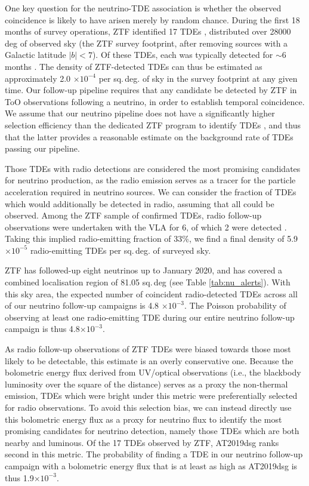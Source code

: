 One key question for the neutrino-TDE association is whether the observed coincidence is likely to have arisen merely by random chance. During the first 18 months of survey operations, ZTF identified 17 TDEs \cite{van_velzen_20}, distributed over 28000 deg of observed sky (the ZTF survey footprint, after removing sources with a Galactic latitude $|b|<7$). Of these TDEs, each was typically detected for $\sim$6 months \cite{van_velzen_20}. The density of ZTF-detected TDEs can thus be estimated as approximately 2.0 $\times 10^{-4}$ per sq.\,deg. of sky in the survey footprint at any given time. Our follow-up pipeline requires that any candidate be detected by ZTF in ToO observations following a neutrino, in order to establish temporal coincidence. We assume that our neutrino pipeline does not have a significantly higher selection efficiency than the dedicated ZTF program to identify TDEs \cite{van_velzen_20}, and thus that the latter provides a reasonable estimate on the background rate of TDEs passing our pipeline.

Those TDEs with radio detections are considered the most promising candidates for neutrino production, as the radio emission serves as a tracer for the particle acceleration required in neutrino sources. We can consider the fraction of TDEs which would additionally be detected in radio, assuming that all could be observed. Among the ZTF sample of confirmed TDEs, radio follow-up observations were undertaken with the VLA for 6, of which 2 were detected \cite{bran}. Taking this implied radio-emitting fraction of 33\%, we find a final density of 5.9 $\times 10^{-5}$ radio-emitting TDEs per sq.\,deg. of surveyed sky. 

ZTF has followed-up eight neutrinos up to January 2020, and has covered a combined localisation region of 81.05 sq.\,deg (see Table \ref{tab:nu_alerts}). With this sky area, the expected number of coincident radio-detected TDEs across all of our neutrino follow-up campaigns is 4.8 $\times 10^{-3}$. The Poisson probability of observing at least one radio-emitting TDE during our entire neutrino follow-up campaign is thus 4.8$ \times 10^{-3}$. 

As radio follow-up observations of ZTF TDEs were biased towards those most likely to be detectable, this estimate is an overly conservative one. Because the bolometric energy flux derived from UV/optical observations (i.e., the blackbody luminosity over the square of the distance) serves as a proxy the non-thermal emission, TDEs which were bright under this metric were preferentially selected for radio observations. To avoid this selection bias, we can instead directly use this bolometric energy flux  as a proxy for neutrino flux to identify the most promising candidates for neutrino detection, namely those TDEs which are both nearby and luminous. Of the 17 TDEs observed by ZTF, AT2019dsg ranks second in this metric. The probability of finding a TDE in our neutrino follow-up campaign with a bolometric energy flux that is at least as high as AT2019dsg is thus 1.9$ \times 10^{-3}$. 

